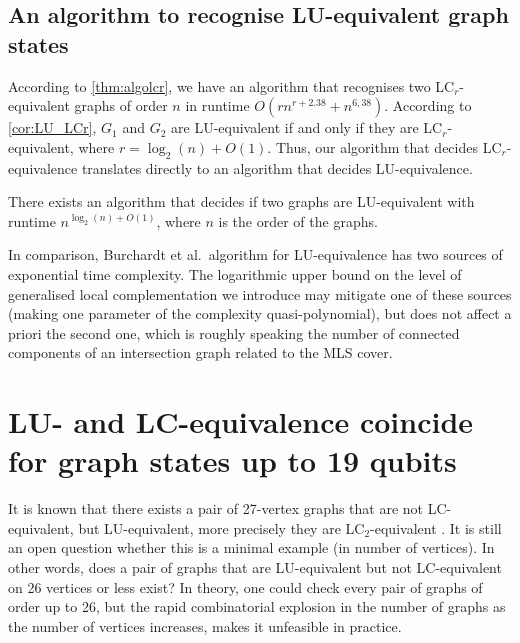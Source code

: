 \documentclass[a4paper,UKenglish,cleveref,autoref,thm-restate]{arxiv}
\begin{document}
\subsection{An algorithm to recognise LU-equivalent graph states} \label{subsec:algorithm_lu}

According to \cref{thm:algolcr}, we have an algorithm that recognises two LC$_r$-equivalent graphs of order $n$ in runtime $O(r n^{r+2.38} + n^{6,38})$. According to \cref{cor:LU_LCr}, $G_1$ and $G_2$ are LU-equivalent if and only if they are LC$_r$-equivalent, where $r=\log_2(n)+O(1)$. Thus, our algorithm that decides LC$_r$-equivalence translates directly to an algorithm that decides LU-equivalence.

\begin{theorem}
    There exists an algorithm that decides if two graphs are LU-equivalent with runtime $n^{\log_2(n)+O(1)}$, where $n$ is the order of the graphs.
\end{theorem}

In comparison, Burchardt et al.~algorithm for LU-equivalence \cite{burchardt2024algorithmverifylocalequivalence} has two sources of exponential time complexity. The logarithmic upper bound on the level of generalised local complementation we introduce may mitigate one of these sources (making one parameter of the complexity quasi-polynomial), but does not affect a priori the second one, which is roughly speaking the number of connected components of an intersection graph related to the MLS cover. 

\section{LU- and LC-equivalence coincide for graph states up to 19 qubits} \label{sec:19qubits}

It is known that there exists a pair of 27-vertex graphs that are not LC-equivalent, but  LU-equivalent, more precisely they are LC$_2$-equivalent \cite{Ji07,Tsimakuridze17}. It is still  an open question whether this is a minimal example (in number of vertices). In other words, does a pair of graphs that are LU-equivalent but not LC-equivalent on 26 vertices or less exist? In theory, one could check every pair of graphs of order up to 26, but the rapid combinatorial explosion in the number of graphs as the number of vertices increases, makes it unfeasible in practice.
\end{document}

